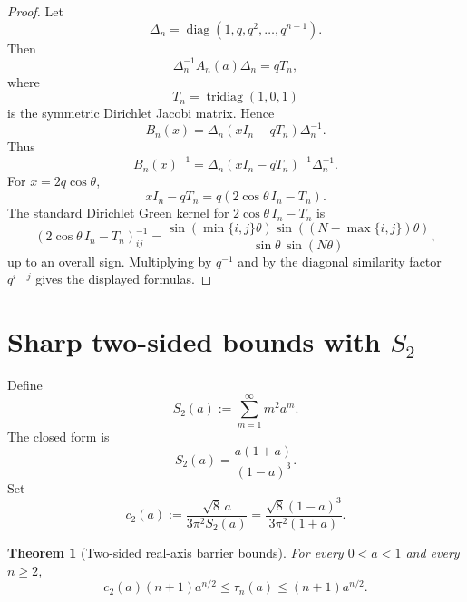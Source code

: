 \documentclass[11pt]{amsart}
\numberwithin{equation}{section}
\DeclareMathOperator{\tridiag}{tridiag}
\DeclareMathOperator{\diag}{diag}
\newtheorem{theorem}{Theorem}[section]
\begin{document}
\begin{proof}
Let
\[
\Delta_n=\diag(1,q,q^2,\dots,q^{n-1}).
\]
Then
\[
\Delta_n^{-1}A_n(a)\Delta_n=qT_n,
\]
where
\[
T_n=\tridiag(1,0,1)
\]
is the symmetric Dirichlet Jacobi matrix.  Hence
\[
B_n(x)
=
\Delta_n(xI_n-qT_n)\Delta_n^{-1}.
\]
Thus
\[
B_n(x)^{-1}
=
\Delta_n(xI_n-qT_n)^{-1}\Delta_n^{-1}.
\]
For \(x=2q\cos\theta\),
\[
xI_n-qT_n
=
q(2\cos\theta\,I_n-T_n).
\]
The standard Dirichlet Green kernel for \(2\cos\theta\,I_n-T_n\) is
\[
\left(2\cos\theta\,I_n-T_n\right)^{-1}_{ij}
=
\frac{
\sin(\min\{i,j\}\theta)\sin((N-\max\{i,j\})\theta)
}{
\sin\theta\,\sin(N\theta)
},
\]
up to an overall sign.  Multiplying by \(q^{-1}\) and by the diagonal similarity factor \(q^{i-j}\) gives the displayed formulas.
\end{proof}

\section{Sharp two-sided bounds with \texorpdfstring{\(S_2\)}{S2}}

Define
\[
S_2(a):=\sum_{m=1}^{\infty}m^2a^m.
\]
The closed form is
\[
S_2(a)=\frac{a(1+a)}{(1-a)^3}.
\]
Set
\[
c_2(a)
:=
\frac{\sqrt8\,a}{3\pi^2S_2(a)}
=
\frac{\sqrt8(1-a)^3}{3\pi^2(1+a)}.
\]

\begin{theorem}[Two-sided real-axis barrier bounds]\label{thm:tau-bounds}
For every \(0<a<1\) and every \(n\ge2\),
\[
c_2(a)(n+1)a^{n/2}
\le
\tau_n(a)
\le
(n+1)a^{n/2}.
\]
\end{theorem}
\end{document}
